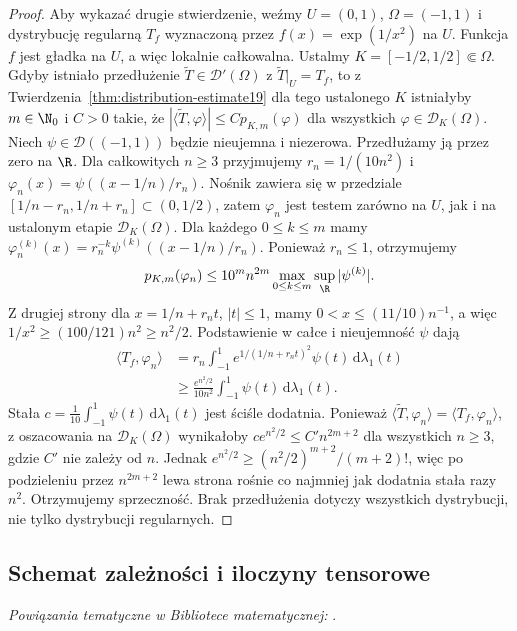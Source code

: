 \begin{proof}
Aby wykazać drugie stwierdzenie, weźmy
$U=(0,1)$, $\Omega=(-1,1)$ i dystrybucję regularną
$T_f$ wyznaczoną przez $f(x)=\exp(1/x^2)$ na $U$.
Funkcja $f$ jest gładka na $U$, a więc lokalnie
całkowalna. Ustalmy $K=[-1/2,1/2]\Subset\Omega$.
Gdyby istniało przedłużenie
$\widetilde T\in\mathcal D'(\Omega)$ z
$\widetilde T|_U=T_f$, to z
Twierdzenia~\ref{thm:distribution-estimate19}
dla tego ustalonego $K$ istniałyby $m\in\N_0$
i $C>0$ takie, że
$|\langle\widetilde T,\varphi\rangle|\le C p_{K,m}(\varphi)$
dla wszystkich $\varphi\in\mathcal D_K(\Omega)$.
Niech $\psi\in\mathcal D((-1,1))$ będzie nieujemna
i niezerowa. Przedłużamy ją przez zero na $\R$.
Dla całkowitych $n\ge3$ przyjmujemy
$r_n=1/(10n^2)$ i
$\varphi_n(x)=\psi((x-1/n)/r_n)$.
Nośnik zawiera się w przedziale
$[1/n-r_n,1/n+r_n]\subset(0,1/2)$, zatem
$\varphi_n$ jest testem zarówno na $U$, jak i na
ustalonym etapie $\mathcal D_K(\Omega)$.
Dla każdego $0\le k\le m$ mamy
$\varphi_n^{(k)}(x)=r_n^{-k}\psi^{(k)}((x-1/n)/r_n)$.
Ponieważ $r_n\le1$, otrzymujemy
\[
 p_{K,m}(\varphi_n)
 \le 10^m n^{2m}\max_{0\le k\le m}
 \sup_{\R}|\psi^{(k)}|.
\]
Z drugiej strony dla $x=1/n+r_nt$, $|t|\le1$,
mamy $0<x\le(11/10)n^{-1}$, a więc
$1/x^2\ge(100/121)n^2\ge n^2/2$.
Podstawienie w całce i nieujemność $\psi$ dają
\[
 \begin{aligned}
 \langle T_f,\varphi_n\rangle
 &=r_n\int_{-1}^1 e^{1/(1/n+r_nt)^2}\psi(t)\,
 \mathrm d\lambda_1(t)\\
 &\ge \frac{e^{n^2/2}}{10n^2}
 \int_{-1}^1\psi(t)\,\mathrm d\lambda_1(t).
 \end{aligned}
\]
Stała $c=\frac1{10}\int_{-1}^1\psi(t)\,\mathrm d\lambda_1(t)$
jest ściśle dodatnia. Ponieważ
$\langle\widetilde T,\varphi_n\rangle=
\langle T_f,\varphi_n\rangle$, z oszacowania na
$\mathcal D_K(\Omega)$ wynikałoby
$c e^{n^2/2}\le C' n^{2m+2}$ dla wszystkich $n\ge3$,
gdzie $C'$ nie zależy od $n$. Jednak
$e^{n^2/2}\ge (n^2/2)^{m+2}/(m+2)!$,
więc po podzieleniu przez $n^{2m+2}$ lewa strona
rośnie co najmniej jak dodatnia stała razy $n^2$.
Otrzymujemy sprzeczność. Brak przedłużenia dotyczy
wszystkich dystrybucji, nie tylko dystrybucji regularnych.
\end{proof}

\subsection{Schemat zależności i iloczyny tensorowe}

\noindent\emph{Powiązania tematyczne w Bibliotece matematycznej:} .


